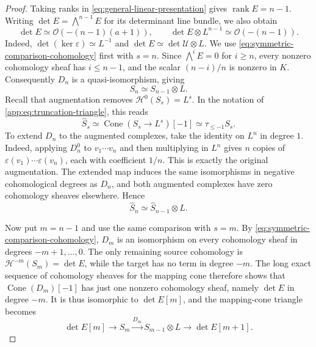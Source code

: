 \documentclass[12pt,reqno,a4paper]{amsart}
\numberwithin{equation}{section}
\numberwithin{figure}{section}
\theoremstyle{plain}
\theoremstyle{definition}
\begin{document}
\begin{proof}
Taking ranks in \eqref{eq:general-linear-presentation} gives
$\operatorname{rank}E=n-1$. Writing
$\det E=\bigwedge^{n-1}E$ for its determinant line bundle, we also obtain
\begin{equation}\label{eq:linear-presentation-determinant}
 \det E\simeq\mathcal O(-(n-1)(a+1)),\qquad
 \det E\otimes L^{n-1}\simeq\mathcal O(-(n-1)).
\end{equation}
Indeed, $\det(\ker\varepsilon)\simeq L^{-1}$ and
$\det E\simeq\det\mathcal U\otimes L$.
We use \eqref{eq:symmetric-comparison-cohomology} first with $s=n$.
Since $\bigwedge^iE=0$ for $i\geq n$, every nonzero cohomology sheaf
has $i\leq n-1$, and the scalar $(n-i)/n$ is nonzero in $K$.
Consequently $D_n$ is a quasi-isomorphism, giving
\begin{equation}\label{eq:refaudit-symmetric-quasi-isomorphism}
 S_n\simeq S_{n-1}\otimes L.
\end{equation}
Recall that augmentation removes $\mathcal H^0(S_s)=L^s$.
In the notation of \eqref{app:eq:truncation-triangle}, this reads
\begin{equation}\label{eq:augmentation-truncation}
 \widehat S_s\simeq
 \operatorname{Cone}(S_s\to L^s)[-1]
 \simeq\tau_{\leq-1}S_s.
\end{equation}
To extend $D_n$ to the augmented complexes, take the identity on
$L^n$ in degree $1$. Indeed, applying $D_n^0$ to $v_1\cdots v_n$
and then multiplying in $L^n$ gives $n$ copies of
$\varepsilon(v_1)\cdots\varepsilon(v_n)$, each with coefficient $1/n$.
This is exactly the original augmentation. The extended map induces
the same isomorphisms in negative cohomological degrees as $D_n$,
and both augmented complexes have zero cohomology sheaves elsewhere. Hence
\begin{equation}\label{eq:augmented-symmetric-comparison}
 \widehat S_n\simeq\widehat S_{n-1}\otimes L.
\end{equation}

Now put $m=n-1$ and use the same comparison with $s=m$.
By \eqref{eq:symmetric-comparison-cohomology}, $D_m$ is an isomorphism
on every cohomology sheaf in degrees $-m+1,\ldots,0$.
The only remaining source cohomology is
$\mathcal H^{-m}(S_m)=\det E$, while the target has no term in degree $-m$.
The long exact sequence of cohomology sheaves for the mapping cone
therefore shows that $\operatorname{Cone}(D_m)[-1]$ has just one
nonzero cohomology sheaf, namely $\det E$ in degree $-m$.
It is thus isomorphic to $\det E[m]$, and the mapping-cone triangle becomes
\begin{equation}\label{eq:symmetric-top-triangle}
 \det E[m]\longrightarrow S_m
 \xrightarrow{D_m}S_{m-1}\otimes L
 \longrightarrow\det E[m+1].
\end{equation}


\end{proof}
\end{document}
